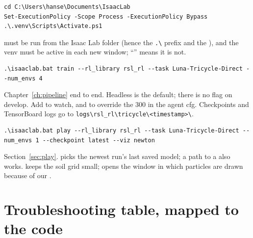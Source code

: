 \begin{lstlisting}[style=shell]
cd C:\Users\hanse\Documents\IsaacLab
Set-ExecutionPolicy -Scope Process -ExecutionPolicy Bypass
.\.venv\Scripts\Activate.ps1
\end{lstlisting}
 must be run from the Isaac Lab folder (hence the
\texttt{.\textbackslash } prefix and the ), and the venv must be active in each new
window; ``'' means it is not.

\begin{lstlisting}[style=shell]
.\isaaclab.bat train --rl_library rsl_rl --task Luna-Tricycle-Direct --num_envs 4
\end{lstlisting}
Chapter~\ref{ch:pipeline} end to end. Headless is the default; there is no
 flag on develop. Add  to watch, and
 to override the 300 in the agent cfg. Checkpoints
and TensorBoard logs go to \texttt{logs\textbackslash rsl\_rl\textbackslash tricycle\textbackslash <timestamp>\textbackslash }.

\begin{lstlisting}[style=shell]
.\isaaclab.bat play --rl_library rsl_rl --task Luna-Tricycle-Direct --num_envs 1 --checkpoint latest --viz newton
\end{lstlisting}
Section~\ref{sec:play}.  picks the newest run's
last saved model; a path to a  also works.  keeps the soil grid small;  opens the window in which
particles are drawn because of our .

\section{Troubleshooting table, mapped to the code}

